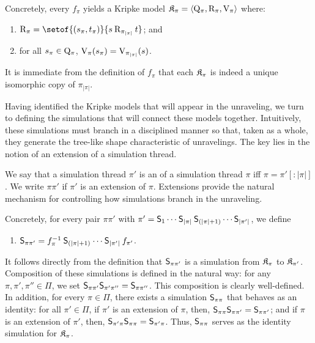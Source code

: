 \begin{definition}
	\medskip
	\noindent
	Concretely, every $f_{\pi}$ yields a Kripke model $\mathfrak{K}_{\pi} = \langle\mathrm{Q}_{\pi}, \mathbin{\mathrm{R}_{\pi}}, \mathrm{V}_{\pi}\rangle$ where:
	\begin{enumerate}[leftmargin=\parindent,resume]
        \setlength{\itemsep}{0pt}
		\item $\Rof{\pi} = \setof{\pair {s_\pi} {t_\pi}}{ s \Rof{\pi_{|\pi|}} t}$; and
		\item for all $s_{\pi} \in \mathrm{Q}_{\pi}$, $\mathrm{V}_{\pi}(s_{\pi}) = \mathrm{V}_{\pi_{|\pi|}}(s)$.
	\end{enumerate}
	It is immediate from the definition of $f_{\pi}$ that each $\mathfrak{K}_{\pi}$ is indeed a unique isomorphic copy of $\pi_{|\pi|}$.

	\medskip
	\noindent
	Having identified the Kripke models that will appear in the unraveling, we turn to defining the simulations that will connect these models together. Intuitively, these simulations must branch in a disciplined manner so that, taken as a whole, they generate the tree-like shape characteristic of unravelings.
	The key lies in the notion of an extension of a simulation thread.
	
	\medskip
	\noindent
	We say that a simulation thread $\pi'$ is an  of a simulation thread $\pi$ iff $\pi = \pi'[{:}|\pi|]$. We write $\pi\pi'$ if $\pi'$ is an extension of $\pi$. Extensions provide the natural mechanism for controlling how simulations branch in the unraveling.

	\medskip
	\noindent
	Concretely, for every pair $\pi\pi'$ with $\pi' = \Sim_1 \dots \Sim_{|\pi|} \Sim_{(|\pi|+1)} \dots \Sim_{|\pi'|}$, we define
	\begin{enumerate}[leftmargin=\parindent,resume]
        \setlength{\itemsep}{0pt}
		\item $\Sim_{\pi\pi'} = f_{\pi}^{-1} \Sim_{(|\pi|+1)} \dots \Sim_{|\pi'|} f_{\pi'}$.
	\end{enumerate}
	It follows directly from the definition that $\mathbin{\mathsf{S}}_{\pi\pi'}$ is a simulation from $\mathfrak{K}_{\pi}$ to $\mathfrak{K}_{\pi'}$.
	Composition of these simulations is defined in the natural way: for any $\pi, \pi', \pi'' \in \Pi$, we set $\mathbin{\mathsf{S}}_{\pi\pi'}\mathbin{\mathsf{S}}_{\pi'\pi''} = \mathbin{\mathsf{S}}_{\pi\pi''}$. This composition is clearly well-defined.
	In addition, for every $\pi \in \Pi$, there exists a simulation $\mathbin{\mathsf{S}}_{\pi\pi}$ that behaves as an identity: for all $\pi' \in \Pi$, if $\pi'$ is an extension of $\pi$, then, $\mathbin{\mathsf{S}}_{\pi\pi}\mathbin{\mathsf{S}}_{\pi\pi'} = \mathbin{\mathsf{S}}_{\pi\pi'}$; and if $\pi$ is an extension of $\pi'$, then, $\mathbin{\mathsf{S}}_{\pi'\pi}\mathbin{\mathsf{S}}_{\pi\pi} = \mathbin{\mathsf{S}}_{\pi'\pi}$.
	Thus, $\mathbin{\mathsf{S}}_{\pi\pi}$ serves as the identity simulation for $\mathfrak{K}_{\pi}$.


\end{definition}
